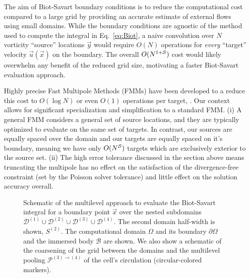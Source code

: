 \documentclass[11pt]{article}
\begin{document}
The aim of Biot-Savart boundary conditions is to reduce the computational cost compared to a large grid by providing an accurate estimate of external flows using small domains. While the boundary conditions are agnostic of the method used to compute the integral in Eq.~\ref{eq:Biot}, a naive convolution over $N$ vorticity ``source'' locations $\vec y$ would require $O(N)$ operations for \textit{every} ``target'' velocity $\vec u(\vec x)$ on the boundary. The overall $O(N^{1+\cal S})$ cost would likely overwhelm any benefit of the reduced grid size, motivating a faster Biot-Savart evaluation approach.


Highly precise Fast Multipole Methods (FMMs) have been developed to a reduce this cost to $O(\log N)$ or even $O(1)$ operations per target, \cite{Greencard1987ASimulations,Ying2004ADimensions, Fong2009TheMethod}. Our context allows for significant specialization and simplification to a standard FMM. (i) A general FMM considers a general set of source locations, and they are typically optimized to evaluate on the same set of targets. In contrast, our sources are equally spaced over the domain and our targets are equally spaced on it's boundary, meaning we have only $O(N^{\cal S})$ targets which are exclusively exterior to the source set. (ii) The high error tolerance discussed in the section above means truncating the multipole has no effect on the satisfaction of the divergence-free constraint (set by the Poisson solver tolerance) and little effect on the solution accuracy overall.

\begin{figure}
    \centering
    \def\svgwidth{0.7\columnwidth}
    
    \caption{Schematic of the multilevel approach to evaluate the Biot-Savart integral for a boundary point $\vec x$ over the nested subdomains $\mathcal{D}^{(1)} \cup \mathcal{D}^{(2)} \cup \mathcal{D}^{(3)} \cup \mathcal{D}^{(4)}$. The second domain half-width is shown, ${S}^{(2)}$. The computational domain $\Omega$ and its boundary $\partial\Omega$ and the immersed body $\mathcal{B}$ are shown. We also show a schematic of the coarsening of the grid between the domains and the multilevel pooling $\mathcal{P}^{(3)\to(4)}$ of the cell's circulation (circular-colored markers). 
    }
    \label{Fig_2}
\end{figure}
\end{document}
